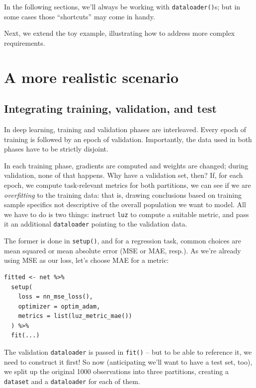 \documentclass[
  letterpaper,
]{krantz}
\begin{document}
In the following sections, we'll always be working with
\texttt{dataloader()}s; but in some cases those ``shortcuts'' may come
in handy.

Next, we extend the toy example, illustrating how to address more
complex requirements.

\hypertarget{a-more-realistic-scenario}{%
\section{A more realistic scenario}\label{a-more-realistic-scenario}}

\hypertarget{integrating-training-validation-and-test}{%
\subsection{Integrating training, validation, and
test}\label{integrating-training-validation-and-test}}

In deep learning, training and validation phases are interleaved. Every
epoch of training is followed by an epoch of validation. Importantly,
the data used in both phases have to be strictly disjoint.

In each training phase, gradients are computed and weights are changed;
during validation, none of that happens. Why have a validation set,
then? If, for each epoch, we compute task-relevant metrics for both
partitions, we can see if we are \emph{overfitting} to the training
data: that is, drawing conclusions based on training sample specifics
not descriptive of the overall population we want to model. All we have
to do is two things: instruct \texttt{luz} to compute a suitable metric,
and pass it an additional \texttt{dataloader} pointing to the validation
data.

The former is done in \texttt{setup()}, and for a regression task,
common choices are mean squared or mean absolute error (MSE or MAE,
resp.). As we're already using MSE as our loss, let's choose MAE for a
metric:

\begin{verbatim}
fitted <- net %>%
  setup(
    loss = nn_mse_loss(),
    optimizer = optim_adam,
    metrics = list(luz_metric_mae())
  ) %>%
  fit(...)
\end{verbatim}

The validation \texttt{dataloader} is passed in \texttt{fit()} -- but to
be able to reference it, we need to construct it first! So now
(anticipating we'll want to have a test set, too), we split up the
original 1000 observations into three partitions, creating a
\texttt{dataset} and a \texttt{dataloader} for each of them.
\end{document}
